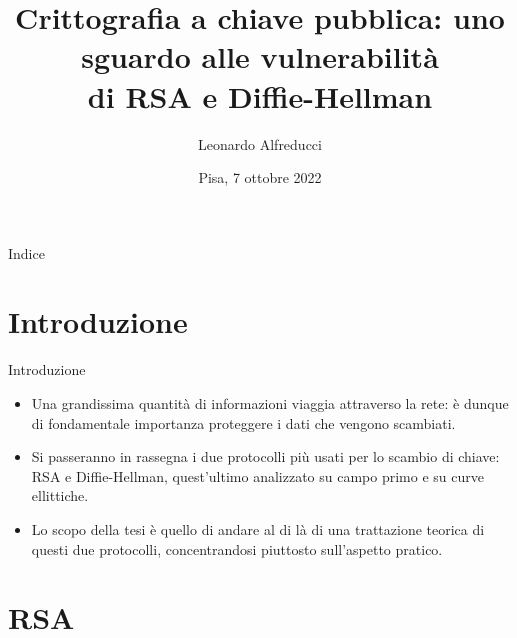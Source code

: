 \documentclass[11pt,svgnames,smaller,aspectratio=169,italian]{beamer}
\title{Crittografia a chiave pubblica: uno sguardo alle vulnerabilità \\ di RSA e Diffie-Hellman}
\author{Leonardo Alfreducci}
\institute[Università di Pisa]{Università di Pisa\\Dipartimento di Informatica}
\date{Pisa, 7 ottobre 2022}
\begin{document}
\begin{frame} 
	\titlepage
\end{frame}



\begin{frame}{Indice}
	\tableofcontents
\end{frame}

\section{Introduzione}
\begin{frame}
	\sectionpage
	\centering
\end{frame}

\begin{frame}{Introduzione}
	\begin{itemize}
		\item Una grandissima quantità di informazioni viaggia attraverso la rete: è dunque di fondamentale importanza proteggere i dati che vengono scambiati.
		\item Si passeranno in rassegna i due protocolli più usati per lo scambio di chiave: RSA e Diffie-Hellman, quest'ultimo analizzato su campo primo e su curve ellittiche.
		\item Lo scopo della tesi è quello di andare al di là di una trattazione teorica di questi due protocolli, concentrandosi piuttosto sull'aspetto pratico.
	\end{itemize}
\end{frame}

\section{RSA} %
\begin{frame}
	\sectionpage
	\centering
\end{frame}
\end{document}
